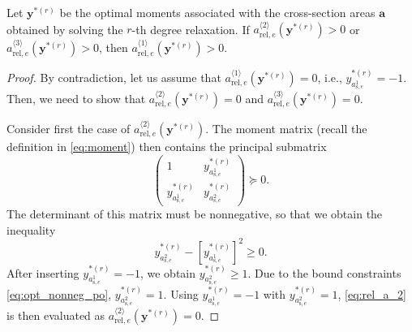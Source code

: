 \documentclass[final,onefignum,onetabnum]{siamart220329}
\newtheorem*{proof}{Proof}%
\begin{document}
\begin{proposition}\label{prop:inertia}
	Let $\mathbf{y}^{*(r)}$ be the optimal moments associated with the cross-section areas $\mathbf{a}$ obtained by solving the $r$-th degree relaxation. If $a_{\mathrm{rel},e}^{\langle 2\rangle}(\mathbf{y}^{*(r)}) > 0$ or $a_{\mathrm{rel},e}^{\langle 3\rangle}(\mathbf{y}^{*(r)}) > 0$, then $a_{\mathrm{rel},e}^{\langle 1\rangle}(\mathbf{y}^{*(r)}) > 0$.
	\begin{proof}
        By contradiction, let us assume that $a_{\mathrm{rel},e}^{\langle 1\rangle}(\mathbf{y}^{*(r)}) = 0$, i.e., $y_{a_{\mathrm{s},e}^1}^{*(r)} = -1$. Then, we need to show that $a_{\mathrm{rel},e}^{\langle 2\rangle}(\mathbf{y}^{*(r)}) = 0$ and $a_{\mathrm{rel},e}^{\langle 3\rangle}(\mathbf{y}^{*(r)}) = 0$.
		
		Consider first the case of $a_{\mathrm{rel},e}^{\langle 2\rangle}(\mathbf{y}^{*(r)})$. The moment matrix {(recall the definition in \eqref{eq:moment})} then contains the principal submatrix
		\begin{equation}
			\begin{pmatrix}
				1 & y_{a_{\mathrm{s},e}^1}^{*(r)}\\
				y_{a_{\mathrm{s},e}^1}^{*(r)} & y_{a_{\mathrm{s},e}^2}^{*(r)}
			\end{pmatrix} \succeq 0.
		\end{equation}
		The determinant of this matrix must be nonnegative, so that we obtain the inequality
		\begin{equation}
			y_{a_{\mathrm{s},e}^2}^{*(r)} - \left[y_{a_{\mathrm{s},e}^1}^{*(r)}\right]^2 \ge 0.
		\end{equation}
		After inserting $y_{a_{\mathrm{s},e}^1}^{*(r)} = -1$, we obtain $y_{a_{\mathrm{s},e}^2}^{*(r)} \ge 1$. Due to the bound constraints \eqref{eq:opt_nonneg_po}, $y_{a_{\mathrm{s},e}^2}^{*(r)} = 1$. Using $y_{a_{\mathrm{s},e}^1}^{*(r)} = -1$ with $y_{a_{\mathrm{s},e}^2}^{*(r)} = 1$, \eqref{eq:rel_a_2} is then evaluated as $a_{\mathrm{rel},e}^{\langle 2\rangle}(\mathbf{y}^{*(r)})=0$.
		

\end{proof}
\end{proposition}
\end{document}

